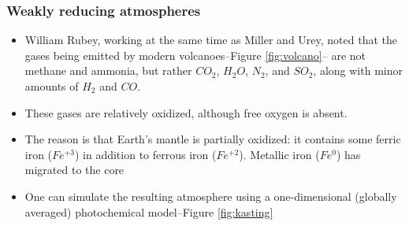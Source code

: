 \documentclass[]{article}
\begin{document}
\subsubsection{Weakly reducing atmospheres}
\begin{itemize}
	\item William Rubey, working at the same time as Miller and Urey, noted that the gases being emitted by modern volcanoes--Figure \ref{fig:volcano}-- are not methane and ammonia, but rather $CO_2$, $H_2O$, $N_2$, and $SO_2$, along with minor amounts of $H_2$ and $CO$\cite{rubey1951geologic}.
	\item These gases are relatively oxidized, although free oxygen is absent.
	\item The reason is that Earth’s mantle is partially oxidized: it 	contains some ferric iron ($Fe^{+3}$) in addition to ferrous iron ($Fe^{+2}$). Metallic iron ($Fe^0$) has migrated to the core \cite{wade2005core}
	\item One can simulate the 	resulting atmosphere using a one-dimensional (globally 	averaged) photochemical model--Figure \ref{fig:kasting}

\end{itemize}
\end{document}
